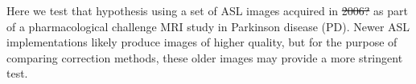Here we test that hypothesis using a set of ASL images acquired in \sout{2006?} as part of a pharmacological challenge MRI study in Parkinson disease (PD).\cite{Black_2010} Newer ASL implementations likely produce images of higher quality, but for the purpose of comparing correction methods, these older images may provide a more stringent test.